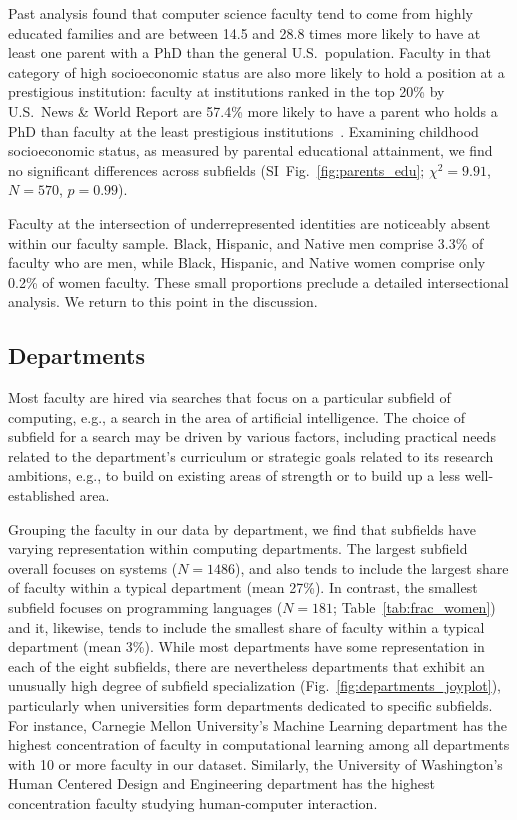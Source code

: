 \documentclass[reprint, twocolumn, aps, nofootinbib, superscriptaddress, longbibliography]{revtex4-1}
\begin{document}
Past analysis found that computer science faculty tend to come from highly educated families and are between 14.5 and 28.8 times more likely to have at least one parent with a PhD than the general U.S.~population. Faculty in that category of high socioeconomic status are also more likely to hold a position at a prestigious institution: faculty at institutions ranked in the top 20\% by U.S.~News \& World Report are 57.4\% more likely to have a parent who holds a PhD than faculty at the least prestigious institutions~\cite{morgan2021socioeconomic}. Examining childhood socioeconomic status, as measured by parental educational attainment, we find no significant differences across subfields (SI~Fig.~\ref{fig:parents_edu}; $\chi^2 = 9.91$, $N = 570$, $p = 0.99$). 


Faculty at the intersection of underrepresented identities are noticeably absent within our faculty sample. Black, Hispanic, and Native men comprise 3.3\% of faculty who are men, while Black, Hispanic, and Native women comprise only 0.2\% of women faculty. These small proportions preclude a detailed intersectional analysis. We return to this point in the discussion. 

\subsection{Departments} 

Most faculty are hired via searches that focus on a particular subfield of computing, e.g., a search in the area of artificial intelligence. The choice of subfield for a search may be driven by various factors, including practical needs related to the department's curriculum or strategic goals related to its research ambitions, e.g., to build on existing areas of strength or to build up a less well-established area. 

Grouping the faculty in our data by department, we find that subfields have varying representation within computing departments. The largest subfield overall focuses on systems ($N = 1486$), and also tends to include the largest share of faculty within a typical department (mean 27\%). In contrast, the smallest subfield focuses on programming languages ($N = 181$; Table~\ref{tab:frac_women}) and it, likewise, tends to include the smallest share of faculty within a typical department (mean 3\%). While most departments have some representation in each of the eight subfields, there are nevertheless departments that exhibit an unusually high degree of subfield specialization (Fig.~\ref{fig:departments_joyplot}), particularly when universities form departments dedicated to specific subfields. For instance, Carnegie Mellon University's Machine Learning department has the highest concentration of faculty in computational learning among all departments with 10 or more faculty in our dataset. Similarly, the University of Washington's Human Centered Design and Engineering department has the highest concentration faculty studying human-computer interaction. 
\end{document}

